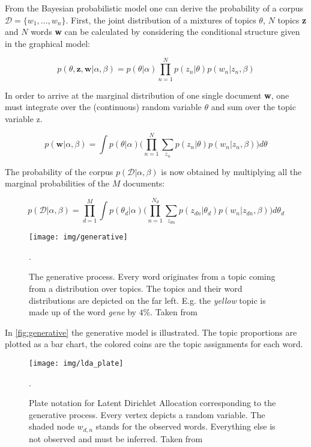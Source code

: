 \documentclass[a4paper,ngerman, english]{atseminar}
\begin{document}
From the Bayesian probabilistic model one can derive the probability of a corpus $\mathcal{D} = \{w_1,...,w_n\}$.
First, the joint distribution of a mixtures of topics $\theta$, $N$ topics \textbf{z} and $N$ words \textbf{w} can
be calculated by considering the conditional structure given in the graphical model:

\begin{equation}
p(\theta, \textbf{z}, \textbf{w} | \alpha, \beta) = p(\theta | \alpha) \prod^{N}_{n=1} p(z_n | \theta)p(w_n | z_n,\beta)
\end{equation}

In order to arrive at the marginal distribution of one single document \textbf{w}, one must integrate over the (continuous) random variable $\theta$ and sum over the topic variable z.

\begin{equation}
p(\textbf{w} | \alpha, \beta) = \int p(\theta | \alpha) \bigg( \prod^{N}_{n=1} \sum_{z_n} p(z_n | \theta)p(w_n | z_n,\beta) \bigg) d\theta
\end{equation}

The probability of the corpus $p(\mathcal{D} | \alpha, \beta)$ is now obtained by multiplying all the marginal probabilities of the $M$ documents:

\begin{equation}
p(\mathcal{D} | \alpha, \beta) = \prod_{d=1}^{M} \int p(\theta_d | \alpha) \bigg( \prod^{N_d}_{n=1} \sum_{z_{dn}} p(z_{dn} | \theta_d)p(w_n | z_{dn},\beta) \bigg) d\theta_d
\end{equation}



\begin{figure}[H]
\centering
\texttt{[image: img/generative]}
\caption{The generative process. Every word originates from a topic coming from a distribution over topics.
The topics and their word distributions are depicted on the far left. E.g. the \textit{yellow} topic is made up of 
the word \textit{gene} by $4\%$. Taken from \cite{blei2012probabilistic}}.
  \label{fig:generative}
\end{figure}

In \autoref{fig:generative} the generative model is illustrated. The topic proportions are plotted
as a bar chart, the colored coins are the topic assignments for each word.



\begin{figure}[H]
\centering
\texttt{[image: img/lda\_plate]}
 \caption{Plate notation for Latent Dirichlet Allocation corresponding to the generative process. Every vertex depicts a random variable.
 The shaded node $w_{d,n}$ stands for the observed words. Everything else is not observed and must be inferred. Taken from \cite{blei2012probabilistic}}.
  \label{fig:lda_plate}
\end{figure}
\end{document}
